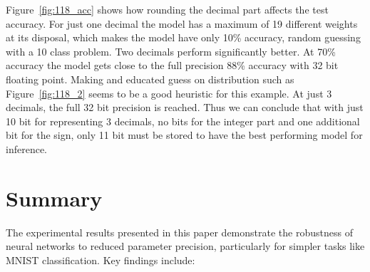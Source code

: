 \documentclass[11pt]{article}
\begin{document}
Figure~\ref{fig:118_acc} shows how rounding the decimal part affects the test
accuracy. For just one decimal the model has a maximum of 19 different weights
at its disposal, which makes the model have only 10\% accuracy, random guessing
with a 10 class problem. Two decimals perform significantly better. At 70\%
accuracy the model gets close to the full precision 88\% accuracy with 32 bit
floating point. Making and educated guess on distribution such as
Figure~\ref{fig:118_2} seems to be a good heuristic for this example. At just 3
decimals, the full 32 bit precision is reached. Thus we can conclude that with
just 10 bit for representing 3 decimals, no bits for the integer part and one
additional bit for the sign, only 11 bit must be stored to have the best
performing model for inference.

\section{Summary}


The experimental results presented in this paper demonstrate the robustness of
neural networks to reduced parameter precision, particularly for simpler tasks
like MNIST classification. Key findings include:
\end{document}
